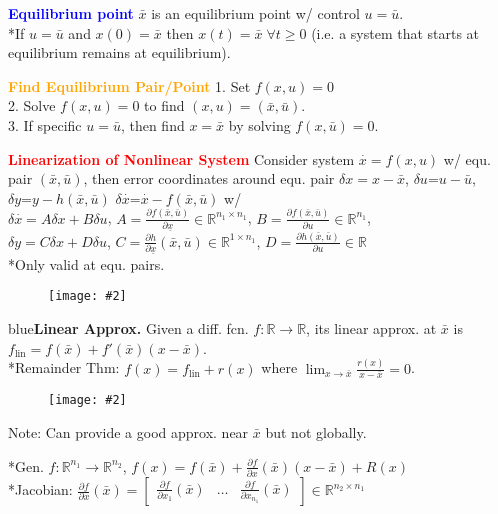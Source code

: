 \documentclass[5pt]{extarticle} %
\newcommand{\customFigure}[3][]{%
    \vspace{-1.5em}
    \begin{figure}[H]
        \centering
        \texttt{[image: \#2]}
    \end{figure}
    \vspace{-1.5em}
}
\begin{document}
\begin{paracol}{3}
{    \textcolor{blue}{\textbf{Equilibrium point}} $\bar{x}$ is an equilibrium point w/ control $u=\bar{u}$. \\
    *If $u=\bar{u}$ and $x(0) = \bar{x}$ then $x(t) = \bar{x} \; \forall t \geq 0$ (i.e. a system that starts at equilibrium remains at equilibrium).

    \textcolor{orange}{\textbf{Find Equilibrium Pair/Point}} 1. Set $f(x,u) = 0$ \\
    2. Solve $f(x,u) = 0$ to find $(x,u) = (\bar{x}, \bar{u})$. \\
    3. If specific $u = \bar{u}$, then find $x = \bar{x}$ by solving $f(x,\bar{u}) = 0$.

    \textcolor{red}{\textbf{Linearization of Nonlinear System}} Consider system $\overset{\cdot}{x} = f(x,u)$ w/ equ. pair $(\bar{x}, \bar{u})$, then error coordinates around equ. pair $\delta x = x - \bar{x}$, $\delta u \text{=} u - \bar{u}$, $\delta y \text{=} y - h(\bar{x},\bar{u})$ $\delta \overset{\cdot}{x} \text{=} \overset{\cdot}{x} - f(\bar{x},\bar{u})$ w/ \\
    $\delta \overset{\cdot}{x} = A \delta x + B \delta u$, $A = \frac{\partial f (\bar{x}, \bar{u})}{\partial \underline{x}}  \in \mathbb{R}^{n_1 \times n_1}$, $B = \frac{\partial f (\bar{x}, \bar{u})}{\partial u} \in \mathbb{R}^{n_1}$, \\
    $\delta y = C \delta x + D \delta u$, $C = \frac{\partial h}{\partial \underline{x}} (\bar{x}, \bar{u}) \in \mathbb{R}^{1 \times n_1}$, $D = \frac{\partial h(\bar{x}, \bar{u})}{\partial u} \in \mathbb{R}$ \\
    *Only valid at equ. pairs.
    \customFigure[0.25]{../Images/L3_0.png}

    \textcolor{blue}{\textbf{Linear Approx.}} Given a diff. fcn. $f: \mathbb{R} \rightarrow \mathbb{R}$, its linear approx. at $\bar{x}$ is $f_{\text{lin}} = f(\bar{x}) + f'(\bar{x})(x-\bar{x})$. \\
    *Remainder Thm: $f(x) = f_{\text{lin}} + r(x)$ where $\lim_{x \rightarrow \bar{x}} \frac{r(x)}{x-\bar{x}} = 0$. 
    \customFigure[0.1]{../Images/L3_1.png}
    
    *Note: Can provide a good approx. near $\bar{x}$ but not globally. 
    
    *Gen. $f: \mathbb{R}^{n_1} \rightarrow \mathbb{R}^{n_2}$, $f(x) = f(\bar{x}) + \frac{\partial f}{\partial x}(\bar{x})(x-\bar{x}) + R(x)$ \\
    *Jacobian: $\frac{\partial f}{\partial x} (\bar{x})  = \begin{bmatrix} \frac{\partial f}{\partial x_1} (\bar{x})  & \ldots & \frac{\partial f}{\partial x_{n_1}} (\bar{x}) \end{bmatrix} \in \mathbb{R}^{n_2 \times n_1}$ 

}
\end{paracol}
\end{document}
